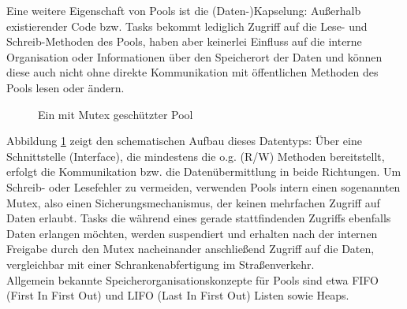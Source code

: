 \documentclass{llncs}
\begin{document}
Eine weitere Eigenschaft von Pools ist die (Daten-)Kapselung: Außerhalb existierender Code bzw. Tasks bekommt lediglich Zugriff auf die Lese- und Schreib-Methoden des Pools, haben aber keinerlei Einfluss auf die interne Organisation oder Informationen über den Speicherort der Daten und können diese auch nicht ohne direkte Kommunikation mit öffentlichen Methoden des Pools lesen oder ändern.\\

\begin{figure}%
	\centering
	\def\svgwidth{.50\columnwidth}

	
	\caption{\label{fig:Pool}Ein mit Mutex geschützter Pool \autocite[vgl.][95]{Cooling2017}}
\end{figure}

Abbildung \ref{fig:Pool} zeigt den schematischen Aufbau dieses Datentyps: Über eine Schnittstelle (Interface), die mindestens die o.g. (R/W) Methoden bereitstellt, erfolgt die Kommunikation bzw. die Datenübermittlung in beide Richtungen. Um Schreib- oder Lesefehler zu vermeiden, verwenden Pools intern einen sogenannten Mutex, also einen Sicherungsmechanismus, der keinen mehrfachen Zugriff auf Daten erlaubt. Tasks die während eines gerade stattfindenden Zugriffs ebenfalls Daten erlangen möchten, werden suspendiert und erhalten nach der internen Freigabe durch den Mutex nacheinander anschließend Zugriff auf die Daten, vergleichbar mit einer Schrankenabfertigung im Straßenverkehr.\\

Allgemein bekannte Speicherorganisationskonzepte für Pools sind etwa FIFO (First In First Out) und LIFO (Last In First Out) Listen sowie Heaps.  
\end{document}
